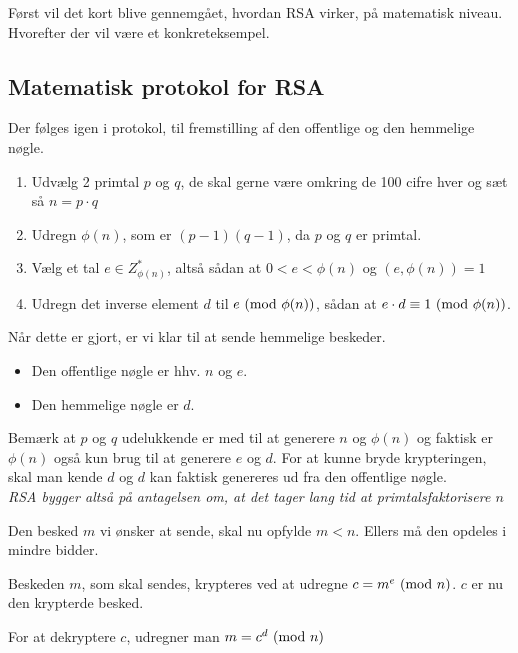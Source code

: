 Først vil det kort blive gennemgået, hvordan RSA virker, på matematisk niveau. Hvorefter der vil være et konkreteksempel.

\subsection{Matematisk protokol for RSA}\label{rsaprot}
Der følges igen i protokol, til fremstilling af den offentlige og den hemmelige nøgle.

\begin{enumerate}[label*=(\arabic*)] %
    \item Udvælg 2 primtal \(p\) og \(q\), de skal gerne være omkring de 100 cifre hver og sæt så \(n = p \cdot q\)
    \item Udregn \(\phi(n)\), som er \((p - 1) (q - 1)\), da \(p\) og \(q\) er primtal.
    \item Vælg et tal \(e \in Z_{\phi(n)}^*\), altså sådan at \(0 < e < \phi(n)\) og \((e, \phi(n)) = 1\)
    \item Udregn det inverse element \(d\) til \(e \ (\mathrm{mod}\ \phi(n))\), sådan at \(e \cdot d \equiv 1 \ (\mathrm{mod}\ \phi(n))\). \label{stepfour}
\end{enumerate}

Når dette er gjort, er vi klar til at sende hemmelige beskeder.

\begin{itemize} %
    \item Den offentlige nøgle er hhv. \(n\) og \(e\).
    \item Den hemmelige nøgle er \(d\).
\end{itemize}

Bemærk at \(p\) og \(q\) udelukkende er med til at generere \(n\) og \(\phi(n)\) og faktisk er \(\phi(n)\) også kun brug til at generere \(e\) og \(d\).
For at kunne bryde krypteringen, skal man kende \(d\) og \(d\) kan faktisk genereres ud fra den offentlige nøgle.\\
\emph{RSA bygger altså på antagelsen om, at det tager lang tid at primtalsfaktorisere \(n\)}
\par

Den besked \(m\) vi ønsker at sende, skal nu opfylde \(m < n\). Ellers må den opdeles i mindre bidder.

Beskeden \(m\), som skal sendes, krypteres ved at udregne \(c = m^e \ (\mathrm{mod}\ n)\). \(c\) er nu den krypterde besked.

For at dekryptere \(c\), udregner man \(m = c^d \ (\mathrm{mod}\ n)\)

